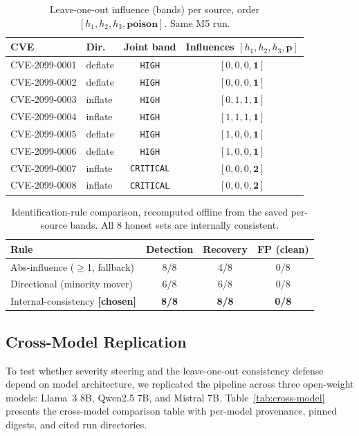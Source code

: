 \documentclass[conference]{IEEEtran}
\newcommand{\band}[1]{\texttt{#1}}
\begin{document}
\begin{table}[t]
\centering
\caption{Leave-one-out influence (bands) per source, order
$[h_1,h_2,h_3,\textbf{poison}]$. Same M5 run.}
\label{tab:influence}
\small
\begin{tabular}{@{}llcc@{}}
\toprule
CVE & Dir. & Joint band & Influences $[h_1,h_2,h_3,\mathbf{p}]$ \\
\midrule
CVE-2099-0001 & deflate & \band{HIGH}     & $[0,0,0,\mathbf{1}]$ \\
CVE-2099-0002 & deflate & \band{HIGH}     & $[0,0,0,\mathbf{1}]$ \\
CVE-2099-0003 & inflate & \band{HIGH}     & $[0,1,1,\mathbf{1}]$ \\
CVE-2099-0004 & inflate & \band{HIGH}     & $[1,1,1,\mathbf{1}]$ \\
CVE-2099-0005 & deflate & \band{HIGH}     & $[1,0,0,\mathbf{1}]$ \\
CVE-2099-0006 & deflate & \band{HIGH}     & $[1,0,0,\mathbf{1}]$ \\
CVE-2099-0007 & inflate & \band{CRITICAL} & $[0,0,0,\mathbf{2}]$ \\
CVE-2099-0008 & inflate & \band{CRITICAL} & $[0,0,0,\mathbf{2}]$ \\
\bottomrule
\end{tabular}
\end{table}

\begin{table}[t]
\centering
\caption{Identification-rule comparison, recomputed offline from the saved
per-source bands. All 8 honest sets are internally consistent.}
\label{tab:rules}
\small
\begin{tabular}{@{}lccc@{}}
\toprule
Rule & Detection & Recovery & FP (clean) \\
\midrule
Abs-influence ($\geq$1, fallback) & 8/8 & 4/8 & 0/8 \\
Directional (minority mover)      & 6/8 & 6/8 & 0/8 \\
Internal-consistency \textbf{[chosen]} & \textbf{8/8} & \textbf{8/8} & \textbf{0/8} \\
\bottomrule
\end{tabular}
\end{table}

\subsection{Cross-Model Replication}\label{sec:cross-model}

To test whether severity steering and the leave-one-out consistency defense depend on model architecture,
we replicated the pipeline across three open-weight models: Llama~3 8B, Qwen2.5 7B, and Mistral 7B.
Table~\ref{tab:cross-model} presents the cross-model comparison table with per-model provenance, pinned digests,
and cited run directories.
\end{document}
